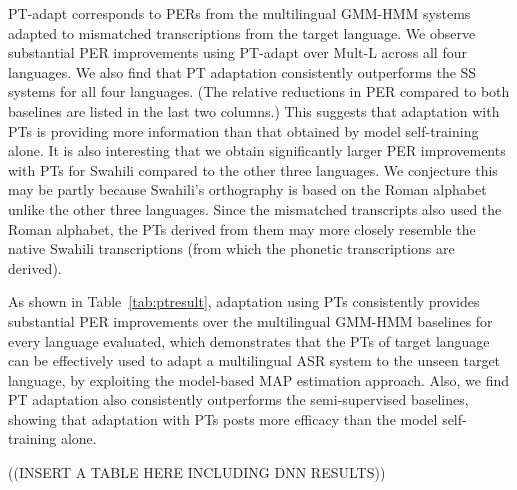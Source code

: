 {\sc PT-adapt} corresponds to PERs from the multilingual GMM-HMM
systems adapted to mismatched transcriptions from the target
language. We observe substantial PER improvements using {\sc PT-adapt}
over {\sc Mult-L} across all four languages. We also find that PT
adaptation consistently outperforms the {\sc SS} systems for all four
languages. (The relative reductions in PER compared to both baselines
are listed in the last two columns.) This suggests that adaptation
with PTs is providing more information than that obtained by model
self-training alone. It is also interesting that we obtain
significantly larger PER improvements with PTs for Swahili compared to
the other three languages. We conjecture this may be partly because
Swahili's orthography is based on the Roman alphabet unlike the other
three languages. Since the mismatched transcripts also used the Roman
alphabet, the PTs derived from them may more closely resemble the
native Swahili transcriptions (from which the phonetic transcriptions
are derived).

As shown in Table~\ref{tab:ptresult}, adaptation using PTs
consistently provides substantial PER improvements over the
multilingual GMM-HMM baselines for every language evaluated, which
demonstrates that the PTs of target language can be effectively used
to adapt a multilingual ASR system to the unseen target language, by
exploiting the model-based MAP estimation approach. Also, we find PT
adaptation also consistently outperforms the semi-supervised
baselines, showing that adaptation with PTs posts more efficacy than
the model self-training alone.

((INSERT A TABLE HERE INCLUDING DNN RESULTS))

